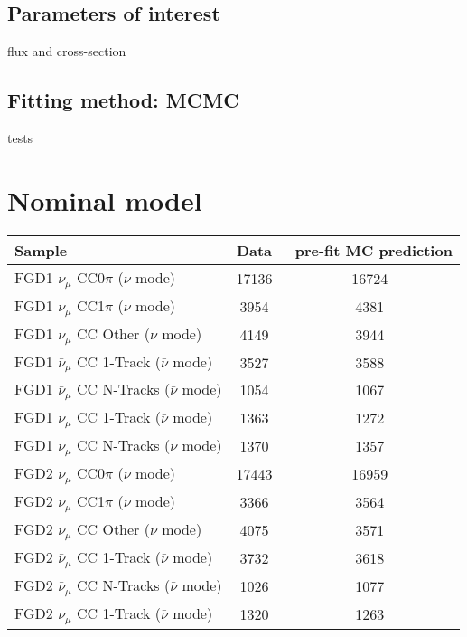 \subsection{Parameters of interest}
flux and cross-section

\subsection{Fitting method: MCMC}
tests

\section{Nominal model}

\begin{table}[htbp]
	\centering
	\begin{tabular}{ l c c }
		\hline
		Sample & Data & \nd~pre-fit MC prediction \\ \hline
		\hline
		FGD1 $\nu_{\mu}$ CC0$\pi$ ($\nu$ mode)                  & 17136 & 16724    \\%
		FGD1 $\nu_{\mu}$ CC1$\pi$ ($\nu$ mode)                  & 3954  & 4381  \\%
		FGD1 $\nu_{\mu}$ CC Other ($\nu$ mode)                  & 4149  & 3944  \\%
		\hline
		FGD1 $\bar{\nu}_{\mu}$ CC 1-Track ($\bar{\nu}$ mode)    & 3527 & 3588  \\%
		FGD1 $\bar{\nu}_{\mu}$ CC N-Tracks ($\bar{\nu}$ mode)   & 1054 & 1067  \\%
		\hline
		FGD1 $\nu_{\mu}$ CC 1-Track ($\bar{\nu}$ mode)          & 1363 & 1272   \\%
		FGD1 $\nu_{\mu}$ CC N-Tracks ($\bar{\nu}$ mode)         & 1370 & 1357   \\%
		\hline
		FGD2 $\nu_{\mu}$ CC0$\pi$ ($\nu$ mode)                  & 17443 & 16959 \\%
		FGD2 $\nu_{\mu}$ CC1$\pi$ ($\nu$ mode)                  & 3366  & 3564  \\%
		FGD2 $\nu_{\mu}$ CC Other ($\nu$ mode)                  & 4075  & 3571  \\%
		\hline
		FGD2 $\bar{\nu}_{\mu}$ CC 1-Track ($\bar{\nu}$ mode)    & 3732 &  3618  \\%
		FGD2 $\bar{\nu}_{\mu}$ CC N-Tracks ($\bar{\nu}$ mode)   & 1026 &  1077  \\%
		\hline
		FGD2 $\nu_{\mu}$ CC 1-Track ($\bar{\nu}$ mode)          & 1320 & 1263  \\%

\end{tabular}
\end{table}
